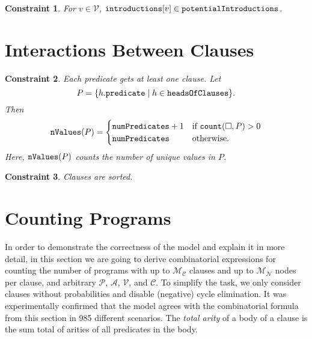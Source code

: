 \documentclass[runningheads]{llncs}
\newtheorem{constraint}{Constraint}
\newcommand{\variable}[1]{\texttt{\textup{#1}}}
\newcommand{\predicates}{\mathcal{P}}
\newcommand{\variables}{\mathcal{V}}
\newcommand{\constants}{\mathcal{C}}
\newcommand{\arities}{\mathcal{A}}
\newcommand{\maxNumNodes}{\mathcal{M}_{\mathcal{N}}}
\newcommand{\maxNumClauses}{\mathcal{M}_{\mathcal{C}}}
\begin{document}
\begin{constraint}
  For $v \in \variables{}$, $\variable{introductions}[v] \in
  \variable{potentialIntroductions}$.
\end{constraint}

\section{Interactions Between Clauses}

\begin{constraint}
  Each predicate gets at least one clause. Let
  \[
    P = \{ h.\variable{predicate} \mid h \in \variable{headsOfClauses} \}.
  \]
  Then
  \[
    \variable{nValues}(P) =
    \begin{cases}
      \variable{numPredicates} + 1 & \text{if } \variable{count}(\Box, P) > 0 \\
      \variable{numPredicates} & \text{otherwise.}
    \end{cases}
  \]
  Here, $\variable{nValues}(P)$ counts the number of unique values in $P$.
\end{constraint}

\begin{constraint}
  Clauses are sorted.
\end{constraint}

\section{Counting Programs}

In order to demonstrate the correctness of the model and explain it in more
detail, in this section we are going to derive combinatorial expressions for
counting the number of programs with up to $\maxNumClauses{}$ clauses and up to
$\maxNumNodes{}$ nodes per clause, and arbitrary $\predicates{}$,
$\arities{}$, $\variables{}$, and $\constants{}$. To simplify the task, we only
consider clauses without probabilities and disable (negative) cycle elimination.
It was experimentally confirmed that the model agrees with the combinatorial
formula from this section in 985 different scenarios. The \emph{total arity} of
a body of a clause is the sum total of arities of all predicates in the body.
\end{document}
